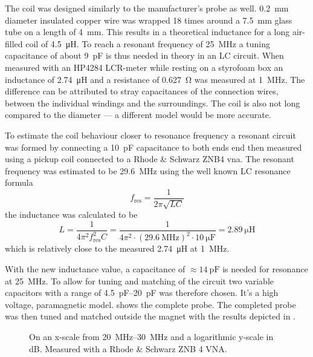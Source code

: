 The coil was designed similarly to the manufacturer's probe as well. \qty{0.2}{\milli\metre} diameter insulated copper wire was wrapped 18 times around a \qty{7.5}{\milli\metre} glass tube on a length of \qty{4}{\milli\metre}. This results in a theoretical inductance for a long air-filled coil of \qty{4.5}{\micro\henry}. To reach a resonant frequency of \qty{25}{\mega\hertz} a tuning capacitance of about \qty{9}{\pico\farad} is thus needed in theory in an LC circuit. When measured with an HP4284 LCR-meter while resting on a styrofoam box an inductance of \qty{2.74}{\micro\henry} and a resistance of \qty{0.627}{\ohm} was measured at \qty{1}{\mega\hertz}. The difference can be attributed to stray capacitances of the connection wires, between the individual windings and the surroundings. The coil is also not long compared to the diameter --- a different model would be more accurate.

To estimate the coil behaviour closer to resonance frequency a resonant circuit was formed by connecting a \qty{10}{\pico\farad} capacitance to both ends end then measured using a pickup coil connected to a Rhode \& Schwarz ZNB4 \acrshort{vna}. The resonant frequency was estimated to be \qty{29.6}{\mega\hertz} using the well known LC resonance formula
\[
    f_{\text{res}} = \frac{1}{2\pi{}\sqrt{LC}}
\]
the inductance was calculated to be
\[
    L = \frac{1}{4\pi{}^2f_{\text{res}}^2C} = \frac{1}{4\pi{}^2 \cdot{} (\qty{29.6}{\mega\hertz})^2 \cdot{} \qty{10}{\micro\farad}} = \qty{2.89}{\micro\henry}
\] which is relatively close to the measured \qty{2.74}{\micro\henry} at \qty{1}{\mega\hertz}.

With the new inductance value, a capacitance of \(\approx{}\qty{14}{\pico\farad}\) is needed for resonance at \qty{25}{\mega\hertz}. To allow for tuning and matching of the circuit two variable capacitors with a range of \qtyrange{4.5}{20}{\pico\farad} was therefore chosen. It's a high voltage, paramagnetic model.  shows the complete probe. The completed probe was then tuned and matched outside the magnet with the results depicted in .

\begin{figure}[hbt]
    \centering
    
    \caption{ On an x-scale from \qtyrange{20}{30}{\mega\hertz} and a logarithmic y-scale in \unit{\deci\bel}. Measured with a Rhode \& Schwarz ZNB 4 VNA.}
\end{figure}

